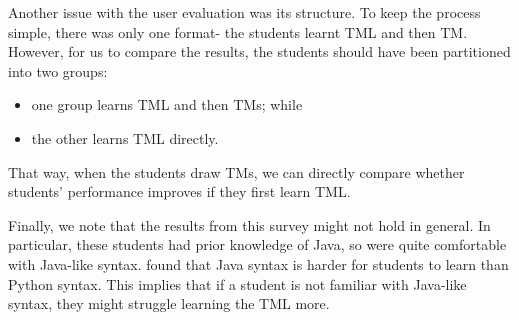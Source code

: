 Another issue with the user evaluation was its structure. To keep the process simple, there was only one format- the students learnt TML and then TM. However, for us to compare the results, the students should have been partitioned into two groups:
\begin{itemize}
    \item one group learns TML and then TMs; while
    \item the other learns TML directly.
\end{itemize}
That way, when the students draw TMs, we can directly compare whether students' performance improves if they first learn TML. 

Finally, we note that the results from this survey might not hold in general. In particular, these students had prior knowledge of Java, so were quite comfortable with Java-like syntax. \citet{lo2015programming} found that Java syntax is harder for students to learn than Python syntax. This implies that if a student is not familiar with Java-like syntax, they might struggle learning the TML more.

